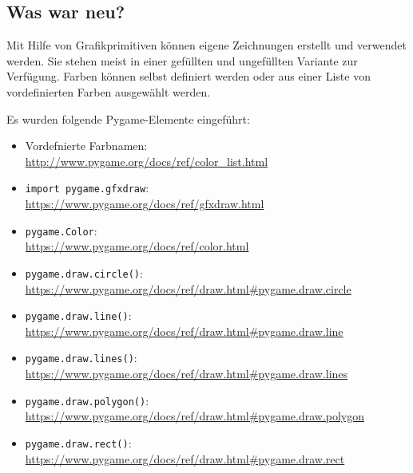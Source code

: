 \subsection*{Was war neu?}

Mit Hilfe von Grafikprimitiven können eigene Zeichnungen erstellt und verwendet werden. Sie stehen meist in einer gefüllten und ungefüllten Variante zur Verfügung. Farben können selbst definiert werden oder aus einer Liste von vordefinierten Farben ausgewählt werden. 

Es wurden folgende Pygame-Elemente eingeführt:

\begin{itemize}
	\item Vordefnierte Farbnamen:\\ 
	\url{http://www.pygame.org/docs/ref/color_list.html}

	\item \texttt{import pygame.gfxdraw}:\\ \url{https://www.pygame.org/docs/ref/gfxdraw.html}
	
	\item \texttt{pygame.Color}:
	\\
	\url{https://www.pygame.org/docs/ref/color.html}
	
	\item \texttt{pygame.draw.circle()}:
	\\
	\url{https://www.pygame.org/docs/ref/draw.html#pygame.draw.circle}
	
	\item \texttt{pygame.draw.line()}:
	\\
	\url{https://www.pygame.org/docs/ref/draw.html#pygame.draw.line}
	
	\item \texttt{pygame.draw.lines()}:
	\\
	\url{https://www.pygame.org/docs/ref/draw.html#pygame.draw.lines}
	
	\item \texttt{pygame.draw.polygon()}:
	\\
	\url{https://www.pygame.org/docs/ref/draw.html#pygame.draw.polygon}
	
	\item \texttt{pygame.draw.rect()}:
	\\
	\url{https://www.pygame.org/docs/ref/draw.html#pygame.draw.rect}
	

\end{itemize}
